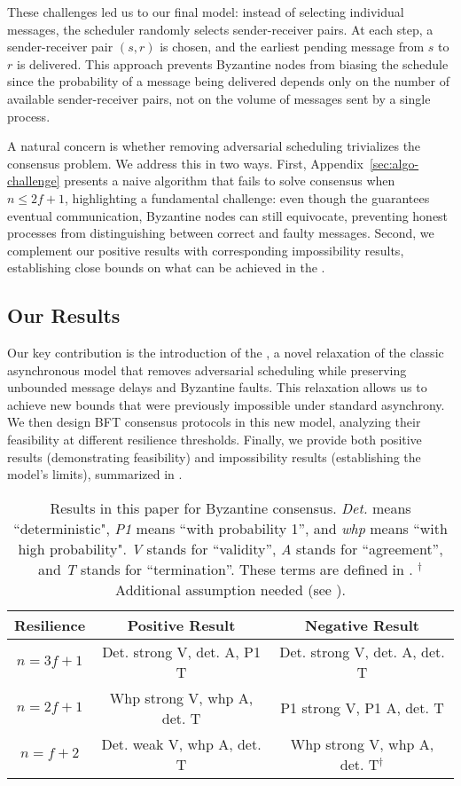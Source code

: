 These challenges led us to our final model: instead of selecting individual messages, the scheduler randomly selects sender-receiver pairs. At each step, a sender-receiver pair $(s, r)$ is chosen, and the earliest pending message from $s$ to $r$ is delivered. This approach prevents Byzantine nodes from biasing the schedule since the probability of a message being delivered depends only on the number of available sender-receiver pairs, not on the volume of messages sent by a single process.

A natural concern is whether removing adversarial scheduling trivializes the consensus problem. We address this in two ways. First, Appendix~\ref{sec:algo-challenge} presents a naive algorithm that fails to solve consensus when $n \leq 2f + 1$, highlighting a fundamental challenge: even though the \model guarantees eventual communication, Byzantine nodes can still equivocate, preventing honest processes from distinguishing between correct and faulty messages. Second, we complement our positive results with corresponding impossibility results, establishing close bounds on what can be achieved in the \model.


\subsection{Our Results}

Our key contribution is the introduction of the \model, a novel relaxation of the classic asynchronous model that removes adversarial scheduling while preserving unbounded message delays and Byzantine faults. This relaxation allows us to achieve new bounds that were previously impossible under standard asynchrony.
%
We then design BFT consensus protocols in this new model, analyzing their feasibility at different resilience thresholds. Finally, we provide both positive results (demonstrating feasibility) and impossibility results (establishing the model's limits), summarized in .

\begin{table}[ht]
  \centering
  \begin{tabular}{ccc}
    \toprule
    Resilience   & Positive Result             & Negative Result               \\
    \midrule
    $n = 3f + 1$ & Det. strong V, det. A, P1 T & Det. strong V, det. A, det. T \\
    $n = 2f + 1$ & Whp strong V, whp A, det. T & P1 strong V, P1 A, det. T   \\
    $n = f + 2$  & Det. weak V, whp A, det. T   & Whp strong V, whp A, det. T$^\dagger$   \\
    \bottomrule
  \end{tabular}
  \caption{
    Results in this paper for Byzantine consensus.
    \textit{Det.} means ``deterministic", \textit{P1} means ``with probability 1'', and \textit{whp} means ``with high probability".  \textit{V} stands for ``validity'', \textit{A} stands for ``agreement'', and \textit{T} stands for ``termination''. These terms are defined in . $^\dagger$Additional assumption needed (see ).
  }
  \label{tab:results-summary}
\end{table}
